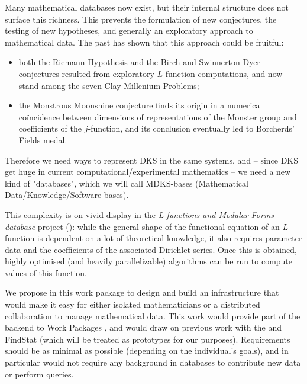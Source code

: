 \begin{Workpackage}{\thewpno}
\begin{WPDescription}
Many mathematical databases now exist, but their internal structure does not surface this richness. This prevents the formulation of new conjectures, the testing of new hypotheses, and generally an exploratory approach to mathematical data. The past has shown that this approach could be fruitful: 
\begin{itemize}
\item both the Riemann Hypothesis and the Birch and Swinnerton Dyer conjectures resulted from exploratory $L$-function computations, and now stand among the seven Clay Millenium Problems;
\item the Monstrous Moonshine conjecture finds its origin in a numerical co\"incidence between dimensions of representations of the Monster group and coefficients of the $j$-function, and its conclusion eventually led to Borcherds' Fields medal.
\end{itemize}


Therefore we need ways to represent DKS in the same systems, and -- since DKS get huge  in current computational/experimental mathematics -- we need a new kind of "databases", which we will call MDKS-bases (Mathematical Data/Knowledge/Software-bases).

This complexity is on vivid display in the \emph{L-functions and Modular Forms database} project (\LMFDB): while the general shape of the functional equation of an $L$-function is dependent on a lot of theoretical knowledge, it also requires parameter data and the coefficients of the associated Dirichlet series. Once this is obtained, highly optimised (and heavily parallelizable) algorithms can be run to compute values of this function. 

We propose in this work package to design and build an infrastructure that would make it easy for either isolated mathematicians or a distributed collaboration to manage mathematical data. This work would provide part of the backend to Work Packages , and would draw on previous work with the \LMFDB and FindStat (which will be treated as prototypes for our purposes). Requirements should be as minimal as possible (depending on the individual's goals), and in particular would not require any background in databases to contribute new data or perform queries. 


\end{WPDescription}
\end{Workpackage}
